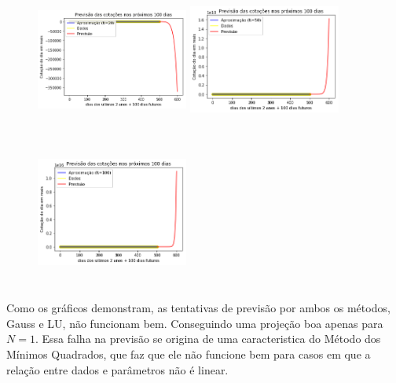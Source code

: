 \documentclass{article}
\begin{document}
\begin{figure}[!htb]
\includegraphics [width=5cm,height=5cm]{PrevisaoLU/P20.png}
\includegraphics [width=5cm,height=5cm]{PrevisaoLU/P50.png}
\includegraphics [width=5cm,height=5cm]{PrevisaoLU/P100.png}
\end{figure}

\newpage

\text Como os gráficos demonstram, as tentativas de previsão por ambos os métodos, Gauss e LU, não funcionam bem. Conseguindo uma projeção boa apenas para $N = 1$. Essa falha na previsão se origina de uma caracteristica do Método dos Mínimos Quadrados, que faz que ele não funcione bem para casos em que a relação entre dados e parâmetros não é linear. 
\end{document}
